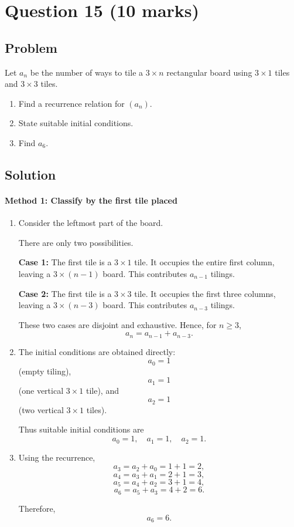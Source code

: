 \documentclass[12pt]{article}
\begin{document}
\newpage
\section{Question 15 \hfill (10 marks)}
\subsection{Problem}

Let $a_n$ be the number of ways to tile a $3\times n$ rectangular board using $3\times 1$ tiles and $3\times 3$ tiles.

\begin{enumerate}[label=(\alph*)]
    \item Find a recurrence relation for $(a_n)$.
    \item State suitable initial conditions.
    \item Find $a_6$.
\end{enumerate}

\subsection{Solution}

\paragraph{Method 1: Classify by the first tile placed}

\begin{enumerate}[label=(\alph*)]
    \item Consider the leftmost part of the board.

    There are only two possibilities.

    \textbf{Case 1:} The first tile is a $3\times 1$ tile. It occupies the entire first column, leaving a $3\times (n-1)$ board. This contributes $a_{n-1}$ tilings.

    \textbf{Case 2:} The first tile is a $3\times 3$ tile. It occupies the first three columns, leaving a $3\times (n-3)$ board. This contributes $a_{n-3}$ tilings.

    These two cases are disjoint and exhaustive. Hence, for $n\ge 3$,
    \[
    \boxed{a_n=a_{n-1}+a_{n-3}.}
    \]

    \item The initial conditions are obtained directly:
    \[
    a_0=1
    \]
    (empty tiling),
    \[
    a_1=1
    \]
    (one vertical $3\times 1$ tile), and
    \[
    a_2=1
    \]
    (two vertical $3\times 1$ tiles).

    Thus suitable initial conditions are
    \[
    \boxed{a_0=1,\quad a_1=1,\quad a_2=1.}
    \]

    \item Using the recurrence,
    \[
    a_3=a_2+a_0=1+1=2,
    \]
    \[
    a_4=a_3+a_1=2+1=3,
    \]
    \[
    a_5=a_4+a_2=3+1=4,
    \]
    \[
    a_6=a_5+a_3=4+2=6.
    \]

    Therefore,
    \[
    \boxed{a_6=6}.
    \]
\end{enumerate}
\end{document}
